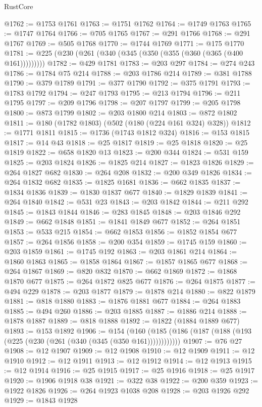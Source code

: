 \begin{lexlean}{RustCore}
\begin{coremodule}
@1762 := @1753 @1761
@1763 := @1751 @1762
@1764 := @1749 @1763
@1765 := @1747 @1764
@1766 := @705 @1765
@1767 := @291 @1766
@1768 := @291 @1767
@1769 := @505 @1768
@1770 := @1744 @1769
@1771 := @175 @1770
@1781 := @225 (@230 (@261 (@340 (@345 (@350 (@355 (@360 (@365 (@400 @161)))))))))
@1782 := @429 @1781
@1783 := @203 @297
@1784 := @274 @243
@1786 := @1784 @75 @214
@1788 := @203 @1786 @214
@1789 := @381 @1788
@1790 := @379 @1789
@1791 := @377 @1790
@1792 := @375 @1791
@1793 := @1783 @1792
@1794 := @247 @1793
@1795 := @213 @1794
@1796 := @211 @1795
@1797 := @209 @1796
@1798 := @207 @1797
@1799 := @205 @1798
@1800 := @873 @1799
@1802 := @203 @1800 @214
@1803 := @872 @1802
@1811 := @180 (@1782 @1803) (@502 (@180 (@224 @161 @324) @328))
@1812 := @1771 @1811
@1815 := @1736 (@1743 @1812 @324)
@1816 := @153 @1815
@1817 := @14 @43
@1818 := @25 @1817
@1819 := @25 @1818
@1820 := @25 @1819
@1822 := @658 @1820 @13
@1823 := @200 @344
@1824 := @531 @159
@1825 := @203 @1824
@1826 := @1825 @214
@1827 := @1823 @1826
@1829 := @264 @1827 @682
@1830 := @264 @208
@1832 := @200 @349 @1826
@1834 := @264 @1832 @682
@1835 := @1825 @1681
@1836 := @662 @1835
@1837 := @1834 @1836
@1839 := @1830 @1837 @677
@1840 := @1829 @1839
@1841 := @264 @1840
@1842 := @531 @23
@1843 := @203 @1842
@1844 := @211 @292
@1845 := @1843 @1844
@1846 := @283 @1845
@1848 := @203 @1846 @292
@1849 := @662 @1848
@1851 := @1841 @1849 @677
@1852 := @264 @1851
@1853 := @533 @215
@1854 := @662 @1853
@1856 := @1852 @1854 @677
@1857 := @264 @1856
@1858 := @200 @354
@1859 := @1745 @159
@1860 := @203 @1859
@1861 := @1745 @192
@1863 := @203 @1861 @214
@1864 := @1860 @1863
@1865 := @1858 @1864
@1867 := @1857 @1865 @677
@1868 := @264 @1867
@1869 := @820 @832
@1870 := @662 @1869
@1872 := @1868 @1870 @677
@1875 := @264 @1872 @825 @677
@1876 := @264 @1875
@1877 := @494 @229
@1878 := @203 @1877
@1879 := @1878 @214
@1880 := @822 @1879
@1881 := @818 @1880
@1883 := @1876 @1881 @677
@1884 := @264 @1883
@1885 := @494 @260
@1886 := @203 @1885
@1887 := @1886 @214
@1888 := @1878 @1887
@1889 := @818 @1888
@1892 := @1822 (@1884 @1889 @677)
@1893 := @153 @1892
@1906 := @154
    (@160 (@185 (@186 (@187 (@188 (@193 (@225 (@230 (@261 (@340 (@345 (@350 @161))))))))))))
@1907 := @76 @27
@1908 := @12 @1907
@1909 := @12 @1908
@1910 := @12 @1909
@1911 := @12 @1910
@1912 := @12 @1911
@1913 := @12 @1912
@1914 := @12 @1913
@1915 := @12 @1914
@1916 := @25 @1915
@1917 := @25 @1916
@1918 := @25 @1917
@1920 := @1906 @1918 @38
@1921 := @322 @38
@1922 := @200 @359
@1923 := @1922 @1826
@1926 := @264 @1923 @1038 @208
@1928 := @203 @1926 @292
@1929 := @1843 @1928

\end{coremodule}
\end{lexlean}
